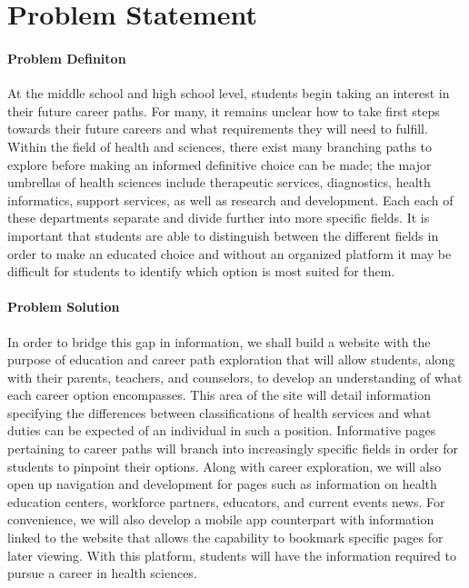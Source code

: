 \documentclass[letterpaper,10pt]{article}
\begin{document}
  \section {Problem Statement}	
    \paragraph {Problem Definiton}
At the middle school and high school level, students begin taking an interest in their future career paths. 
For many, it remains unclear how to take first steps towards their future careers and what requirements they will need to fulfill.
Within the field of health and sciences, there exist many branching paths to explore before making an informed definitive choice can be made; the major umbrellas of health sciences include therapeutic services, diagnostics, health informatics, support services, as well as research and development. 
Each each of these departments separate and divide further into more specific fields. 
It is important that students are able to distinguish between the different fields in order to make an educated choice and without an organized platform it may be difficult for students to identify which option is most suited for them. 




 \paragraph {Problem Solution}
In order to bridge this gap in information, we shall build a website with the purpose of education and career path exploration that will allow students, along with their parents, teachers, and counselors, to develop an understanding of what each career option encompasses.
This area of the site will detail information specifying the differences between classifications of health services and what duties can be expected of an individual in such a position.  
Informative pages pertaining to career paths will branch into increasingly specific fields  in order for students to pinpoint their options. 
Along with career exploration, we will also open up navigation and development for pages such as information on health education centers, workforce partners, educators, and current events news. 
For convenience, we will also develop a mobile app counterpart with information linked to the website that allows the capability to bookmark specific pages for later viewing.
With this platform, students will have the information required to pursue a career in health sciences.
\end{document}
